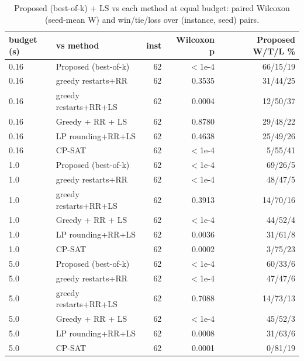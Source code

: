 \begin{table}[t]
\centering
\caption{Proposed (best-of-k) + LS vs each method at equal budget: paired Wilcoxon (seed-mean W) and win/tie/loss over (instance, seed) pairs.}
\label{tab:equal_time_tests}
\scriptsize
\begin{tabular}{llrrr}
\toprule
budget (s) & vs method & inst & Wilcoxon p & Proposed W/T/L \% \\
\midrule
0.16 & Proposed (best-of-k) & 62 & $<$1e-4 & 66/15/19 \\
0.16 & greedy restarts+RR & 62 & 0.3535 & 31/44/25 \\
0.16 & greedy restarts+RR+LS & 62 & 0.0004 & 12/50/37 \\
0.16 & Greedy + RR + LS & 62 & 0.8780 & 29/48/22 \\
0.16 & LP rounding+RR+LS & 62 & 0.4638 & 25/49/26 \\
0.16 & CP-SAT & 62 & $<$1e-4 & 5/55/41 \\
1.0 & Proposed (best-of-k) & 62 & $<$1e-4 & 69/26/5 \\
1.0 & greedy restarts+RR & 62 & $<$1e-4 & 48/47/5 \\
1.0 & greedy restarts+RR+LS & 62 & 0.3913 & 14/70/16 \\
1.0 & Greedy + RR + LS & 62 & $<$1e-4 & 44/52/4 \\
1.0 & LP rounding+RR+LS & 62 & 0.0036 & 31/61/8 \\
1.0 & CP-SAT & 62 & 0.0002 & 3/75/23 \\
5.0 & Proposed (best-of-k) & 62 & $<$1e-4 & 60/33/6 \\
5.0 & greedy restarts+RR & 62 & $<$1e-4 & 47/47/6 \\
5.0 & greedy restarts+RR+LS & 62 & 0.7088 & 14/73/13 \\
5.0 & Greedy + RR + LS & 62 & $<$1e-4 & 45/52/3 \\
5.0 & LP rounding+RR+LS & 62 & 0.0008 & 31/63/6 \\
5.0 & CP-SAT & 62 & 0.0001 & 0/81/19 \\
\bottomrule
\end{tabular}
\end{table}
